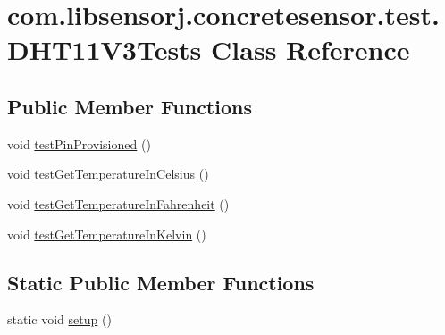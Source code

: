\hypertarget{classcom_1_1libsensorj_1_1concretesensor_1_1test_1_1DHT11V3Tests}{}\section{com.\+libsensorj.\+concretesensor.\+test.\+D\+H\+T11\+V3\+Tests Class Reference}
\label{classcom_1_1libsensorj_1_1concretesensor_1_1test_1_1DHT11V3Tests}
\subsection*{Public Member Functions}
\begin{DoxyCompactItemize}
\item 
void \hyperlink{classcom_1_1libsensorj_1_1concretesensor_1_1test_1_1DHT11V3Tests_ab3427bd3d108c922dd65f661a2163cbd}{test\+Pin\+Provisioned} ()
\item 
void \hyperlink{classcom_1_1libsensorj_1_1concretesensor_1_1test_1_1DHT11V3Tests_ab3d399c94618aa2743dde25e5562cd9b}{test\+Get\+Temperature\+In\+Celsius} ()
\item 
void \hyperlink{classcom_1_1libsensorj_1_1concretesensor_1_1test_1_1DHT11V3Tests_ae9c538bf56fb20f9ee038b2aafdfd308}{test\+Get\+Temperature\+In\+Fahrenheit} ()
\item 
void \hyperlink{classcom_1_1libsensorj_1_1concretesensor_1_1test_1_1DHT11V3Tests_a054d8adbb80ae717587f1a572d2c4954}{test\+Get\+Temperature\+In\+Kelvin} ()
\end{DoxyCompactItemize}
\subsection*{Static Public Member Functions}
\begin{DoxyCompactItemize}
\item 
static void \hyperlink{classcom_1_1libsensorj_1_1concretesensor_1_1test_1_1DHT11V3Tests_a825eabc3f80c23c602ce09fc99b1b277}{setup} ()
\end{DoxyCompactItemize}
